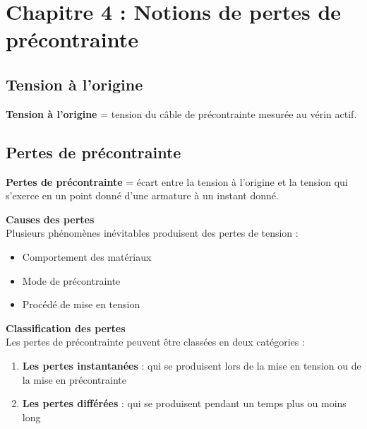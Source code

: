 \documentclass[12pt,a4paper]{article}
\begin{document}
\newpage
\section{Chapitre 4 : Notions de pertes de précontrainte}

\subsection{Tension à l'origine}

\begin{definitionbox}
\textbf{Tension à l'origine} = tension du câble de précontrainte mesurée au vérin actif.
\end{definitionbox}

\subsection{Pertes de précontrainte}

\begin{definitionbox}
\textbf{Pertes de précontrainte} = écart entre la tension à l'origine et la tension qui s'exerce en un point donné d'une armature à un instant donné.
\end{definitionbox}

\begin{infobox}
\textbf{Causes des pertes}\\
Plusieurs phénomènes inévitables produisent des pertes de tension :
\begin{itemize}
    \item Comportement des matériaux
    \item Mode de précontrainte
    \item Procédé de mise en tension
\end{itemize}
\end{infobox}

\begin{infobox}
\textbf{Classification des pertes}\\
Les pertes de précontrainte peuvent être classées en deux catégories :
\begin{enumerate}
    \item \textbf{Les pertes instantanées} : qui se produisent lors de la mise en tension ou de la mise en précontrainte
    \item \textbf{Les pertes différées} : qui se produisent pendant un temps plus ou moins long
\end{enumerate}
\end{infobox}
\end{document}
